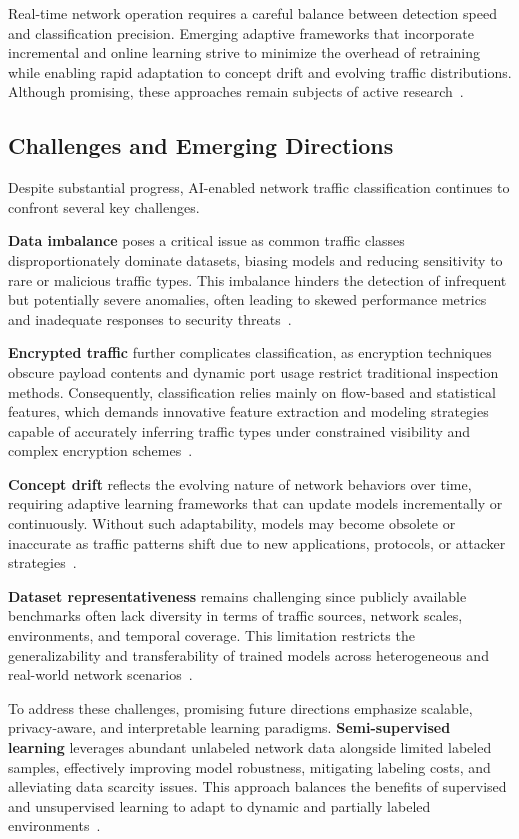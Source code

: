 \documentclass[sigconf]{acmart}
\begin{document}
Real-time network operation requires a careful balance between detection speed and classification precision. Emerging adaptive frameworks that incorporate incremental and online learning strive to minimize the overhead of retraining while enabling rapid adaptation to concept drift and evolving traffic distributions. Although promising, these approaches remain subjects of active research~\cite{ref51}.

\subsection{Challenges and Emerging Directions}

Despite substantial progress, AI-enabled network traffic classification continues to confront several key challenges.

\textbf{Data imbalance} poses a critical issue as common traffic classes disproportionately dominate datasets, biasing models and reducing sensitivity to rare or malicious traffic types. This imbalance hinders the detection of infrequent but potentially severe anomalies, often leading to skewed performance metrics and inadequate responses to security threats~\cite{ref51}.

\textbf{Encrypted traffic} further complicates classification, as encryption techniques obscure payload contents and dynamic port usage restrict traditional inspection methods. Consequently, classification relies mainly on flow-based and statistical features, which demands innovative feature extraction and modeling strategies capable of accurately inferring traffic types under constrained visibility and complex encryption schemes~\cite{ref51}.

\textbf{Concept drift} reflects the evolving nature of network behaviors over time, requiring adaptive learning frameworks that can update models incrementally or continuously. Without such adaptability, models may become obsolete or inaccurate as traffic patterns shift due to new applications, protocols, or attacker strategies~\cite{ref51}.

\textbf{Dataset representativeness} remains challenging since publicly available benchmarks often lack diversity in terms of traffic sources, network scales, environments, and temporal coverage. This limitation restricts the generalizability and transferability of trained models across heterogeneous and real-world network scenarios~\cite{ref51}.

To address these challenges, promising future directions emphasize scalable, privacy-aware, and interpretable learning paradigms. \textbf{Semi-supervised learning} leverages abundant unlabeled network data alongside limited labeled samples, effectively improving model robustness, mitigating labeling costs, and alleviating data scarcity issues. This approach balances the benefits of supervised and unsupervised learning to adapt to dynamic and partially labeled environments~\cite{ref50,ref51}.
\end{document}
